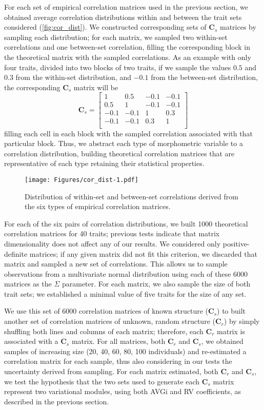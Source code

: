 \documentclass[12pt,]{article}
\begin{document}
For each set of empirical correlation matrices used in the previous
section, we obtained average correlation distributions within and
between the trait sets considered (\autoref{fig:cor_dist}). We
constructed corresponding sets of $\mathbf{C}_{s}$ matrices by sampling
each distribution; for each matrix, we sampled two within-set
correlations and one between-set correlation, filling the corresponding
block in the theoretical matrix with the sampled correlations. As an
example with only four traits, divided into two blocks of two traits, if
we sample the values $0.5$ and $0.3$ from the within-set distribution,
and $-0.1$ from the between-set distribution, the corresponding
$\mathbf{C}_{s}$ matrix will be \[
\mathbf{C}_s =
\begin{bmatrix}
1 & 0.5 & -0.1 & -0.1 \\
0.5 & 1 & -0.1 & -0.1 \\
-0.1 & -0.1 & 1 & 0.3 \\
-0.1 & -0.1 & 0.3 & 1 \\
\end{bmatrix}
\] filling each cell in each block with the sampled correlation
associated with that particular block. Thus, we abstract each type of
morphometric variable to a correlation distribution, building
theoretical correlation matrices that are representative of each type
retaining their statistical properties.

\begin{figure}[htbp]
\centering
\texttt{[image: Figures/cor\_dist-1.pdf]}
\caption{Distribution of within-set and between-set correlations derived
from the six types of empirical correlation matrices.
\label{fig:cor_dist}}
\end{figure}

For each of the six pairs of correlation distributions, we built 1000
theoretical correlation matrices for 40 traits; previous tests indicate
that matrix dimensionality does not affect any of our results. We
considered only positive-definite matrices; if any given matrix did not
fit this criterion, we discarded that matrix and sampled a new set of
correlations. This allows us to sample observations from a multivariate
normal distribution using each of these 6000 matrices as the $\Sigma$
parameter. For each matrix, we also sample the size of both trait sets;
we established a minimal value of five traits for the size of any set.

We use this set of 6000 correlation matrices of known structure
($\mathbf{C}_s$) to built another set of correlation matrices of
unknown, random structure ($\mathbf{C}_r$) by simply shuffling both
lines and columns of each matrix; therefore, each $\mathbf{C}_r$ matrix
is associated with a $\mathbf{C}_s$ matrix. For all matrices, both
$\mathbf{C}_r$ and $\mathbf{C}_s$, we obtained samples of increasing
size (20, 40, 60, 80, 100 individuals) and re-estimated a correlation
matrix for each sample, thus also considering in our tests the
uncertainty derived from sampling. For each matrix estimated, both
$\mathbf{C}_r$ and $\mathbf{C}_s$, we test the hypothesis that the two
sets used to generate each $\mathbf{C}_s$ matrix represent two
variational modules, using both AVGi and RV coefficients, as described
in the previous section.
\end{document}
